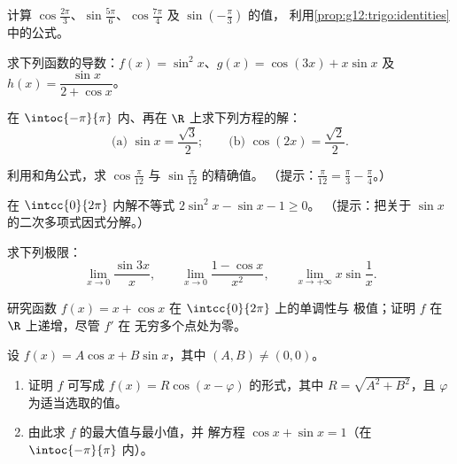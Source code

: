 \begin{exercise}[$\star$]\label{exo:g12:trigo:1}
计算 $\cos\frac{2\pi}{3}$、$\sin\frac{5\pi}{6}$、$\cos\frac{7\pi}{4}$ 及
$\sin\left(-\frac{\pi}{3}\right)$ 的值，
利用\cref{prop:g12:trigo:identities}中的公式。
\end{exercise}

\begin{exercise}[$\star$]\label{exo:g12:trigo:2}
求下列函数的导数：$f(x) = \sin^2 x$、$g(x) = \cos(3x) + x\sin x$ 及
$h(x) = \dfrac{\sin x}{2 + \cos x}$。
\end{exercise}

\begin{exercise}[$\star$]\label{exo:g12:trigo:3}
在 $\intoc{-\pi}{\pi}$ 内、再在 $\R$ 上求下列方程的解：
\[
\text{(a) } \sin x = \frac{\sqrt3}{2};
\qquad
\text{(b) } \cos\left(2x\right) = \frac{\sqrt2}{2} .
\]
\end{exercise}

\begin{exercise}[$\star\star$]\label{exo:g12:trigo:4}
利用和角公式，求
$\cos\frac{\pi}{12}$ 与 $\sin\frac{\pi}{12}$ 的精确值。
（提示：$\frac{\pi}{12} = \frac{\pi}{3} - \frac{\pi}{4}$。）
\end{exercise}

\begin{exercise}[$\star\star$]\label{exo:g12:trigo:5}
在 $\intcc{0}{2\pi}$ 内解不等式 $2\sin^2 x - \sin x - 1 \geq 0$。
（提示：把关于 $\sin x$ 的二次多项式因式分解。）
\end{exercise}

\begin{exercise}[$\star\star$]\label{exo:g12:trigo:6}
求下列极限：
\[
\lim_{x\to0} \frac{\sin 3x}{x}, \qquad
\lim_{x\to0} \frac{1 - \cos x}{x^2}, \qquad
\lim_{x\to+\infty} x \sin\frac{1}{x}.
\]
\end{exercise}

\begin{exercise}[$\star\star$]\label{exo:g12:trigo:7}
研究函数 $f(x) = x + \cos x$ 在 $\intcc{0}{2\pi}$ 上的单调性与
极值；证明 $f$ 在 $\R$ 上递增，尽管 $f'$ 在
无穷多个点处为零。
\end{exercise}

\begin{exercise}[$\star\star\star$]\label{exo:g12:trigo:8}
设 $f(x) = A\cos x + B \sin x$，其中 $(A,B) \neq (0,0)$。
\begin{enumerate}
  \item 证明 $f$ 可写成 $f(x) = R\cos(x - \varphi)$ 的形式，其中
        $R = \sqrt{A^2 + B^2}$，且 $\varphi$ 为适当选取的值。
  \item 由此求 $f$ 的最大值与最小值，并
        解方程 $\cos x + \sin x = 1$（在 $\intoc{-\pi}{\pi}$ 内）。
\end{enumerate}
\end{exercise}

